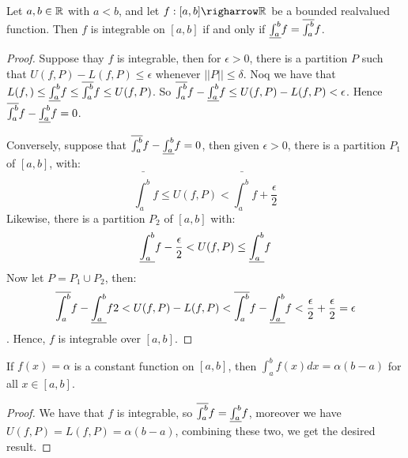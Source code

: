 \begin{theorem}\label{5.1.5}
    Let $a,b \in \mathbb{R}$ with  $a<b$, and let  $f:[a,b] \righarrow \R$ be a bounded realvalued function.
    Then  $f$ is integrable on  $[a,b]$ if and only if  $\underline{\int_{a}^{b}}{f}=\overline{\int_{a}^{b}}{f}$.
\end{theorem}
\begin{proof}
    Suppose thay $f$ is integrable, then for  $\epsilon>0$, there is a partition  $P$ such that  $U(f,P)-L(f,P) \leq \epsilon$ whenever  $||P|| \leq \delta$.
    Noq we have that $L(f,) \leq \underline{\int_{a}^{b}}{f} \leq \overline{\int_{a}^{b}}{f} \leq U(f,P)$.
    So  $\overline{\int_{a}^{b}}{f}-\underline{\int_{a}^{b}}{f} \leq U(f,P)-L(f,P)<\epsilon$. Hence  $\overline{\int_{a}^{b}}{f}-\underline{\int_{a}^{b}}{f}=0$.

    Conversely, suppose that $\overline{\int_{a}^{b}}{f}-\underline{\int_{a}^{b}}{f}=0$, then given $\epsilon>0$, there is a partition  $P_1$ of  $[a,b]$, with:
        \begin{equation*}
             \bar{\int_{a}^{b}}{f} \leq U(f,P)<	\bar{\int_{a}^{b}}{f}+\frac{\epsilon}{2}
        \end{equation*}
Likewise, there is a partition $P_2$ of $[a,b]$ with:
        \begin{equation*}
            \underline{\int_{a}^{b}}{f}-\frac{\epsilon}{2}<U(f,P) \leq \underline{\int_{a}^{b}}{f}
        \end{equation*}
        Now let $P=P_1 \cup P_2$, then:
        \begin{equation*}
            \overline{\int_{a}^{b}}{f}-\underline{\int_{a}^{b}}{f}{2}<U(f,P)-L(f,P)<\overline{\int_{a}^{b}}{f}-\underline{\int_{a}^{b}}{f}<\frac{\epsilon}{2}+\frac{\epsilon}{2}=\epsilon
        \end{equation*}.
        Hence, $f$ is integrable over  $[a,b]$.
\end{proof}

\begin{theorem}\label{5.1.6}
    If $f(x)=\alpha$ is a constant function on  $[a,b]$, then  $\int_{a}^{b}{f(x) dx}=\alpha(b-a)$ for all  $x \in [a,b]$.
\end{theorem}
\begin{proof}
    We have that $f$ is integrable, so  $\overline{\int_{a}^{b}}{f}=\underline{\int_{a}^{b}}{f}$, moreover we have  $U(f,P)=L(f,P)=\alpha(b-a)$, combining these two, we get the desired result.
\end{proof}
